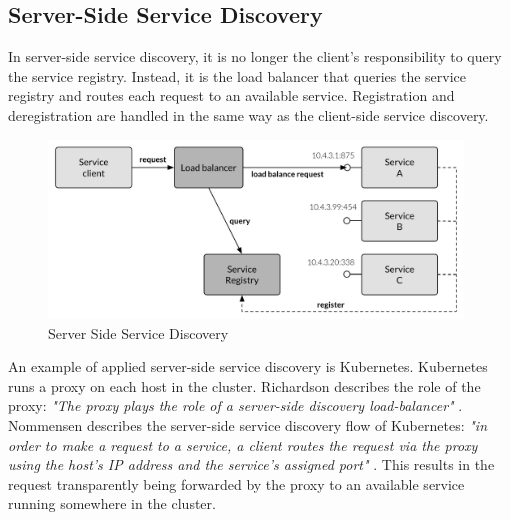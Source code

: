 \subsection*{Server-Side Service Discovery}
In server-side service discovery, it is no longer the client's responsibility to query the service registry. Instead, it is the load balancer that queries the service registry and routes each request to an available service. Registration and deregistration are handled in the same way as the client-side service discovery. 

\begin{figure}[H]
    \centering
    \includegraphics[width=11cm]{figures/server_side_service_discovery}
    \caption{Server Side Service Discovery \cite{servicediscovery}}
    \label{fig:server_side_service_discovery}
\end{figure}

\noindent An example of applied server-side service discovery is Kubernetes. Kubernetes runs a proxy on each host in the cluster. Richardson describes the role of the proxy: \textit{"The proxy plays the role of a server-side discovery load-balancer"} \cite[p. 7]{servicediscovery}. Nommensen describes the server-side service discovery flow of Kubernetes: \textit{"in order to make a request to a service, a client routes the request via the proxy using the host's IP address and the service's assigned port"} \cite{servicediscovery_nommensen}. This results in the request transparently being forwarded by the proxy to an available service running somewhere in the cluster. \\